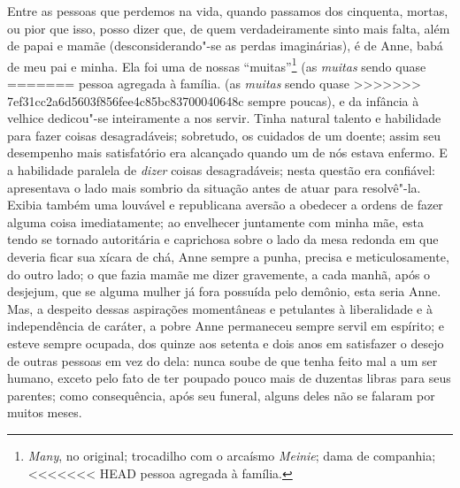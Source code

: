 {{{{{{{{{{{{%
Entre as pessoas que perdemos na vida, quando passamos dos
cinquenta, mortas, ou pior que isso, posso dizer que, de quem
verdadeiramente sinto mais falta, além de papai e mamãe 
(desconsiderando"-se as perdas imaginárias), é de Anne, babá de meu pai e
minha. Ela foi uma de nossas ``muitas''\footnote{\textit{Many}, no
  original; trocadilho com o arcaísmo \textit{Meinie}; dama de companhia;
<<<<<<< HEAD
  pessoa agregada à família.} (as \textit{muitas} sendo quase
=======
  pessoa agregada à família.  (as \textit{muitas} sendo quase
>>>>>>> 7ef31cc2a6d5603f856fee4c85bc83700040648c
sempre poucas), e da infância à velhice dedicou"-se inteiramente a nos
servir. Tinha natural talento e habilidade para fazer coisas
desagradáveis; sobretudo, os cuidados de um doente; assim seu desempenho
mais satisfatório era alcançado quando um de nós estava enfermo. E a
habilidade paralela de \textit{dizer} coisas desagradáveis; nesta questão
era confiável: apresentava o lado mais sombrio da situação antes de
atuar para resolvê"-la. Exibia também uma louvável e republicana aversão
a obedecer a ordens de fazer alguma coisa imediatamente; ao envelhecer
juntamente com minha mãe, esta tendo se tornado autoritária e caprichosa
sobre o lado da mesa redonda em que deveria ficar sua xícara de chá,
Anne sempre a punha, precisa e meticulosamente, do outro lado; o que
fazia mamãe me dizer gravemente, a cada manhã, após o desjejum, que se
alguma mulher já fora possuída pelo demônio, esta seria Anne. Mas, a
despeito dessas aspirações momentâneas e petulantes à liberalidade e à
independência de caráter, a pobre Anne permaneceu sempre servil em
espírito; e esteve sempre ocupada, dos quinze aos setenta e dois anos em
satisfazer o desejo de outras pessoas em vez do dela: nunca soube de que
tenha feito mal a um ser humano, exceto pelo fato de ter poupado pouco
mais de duzentas libras para seus parentes; como consequência, após seu
funeral, alguns deles não se falaram por muitos meses.

}}}}}}}}}}}}
